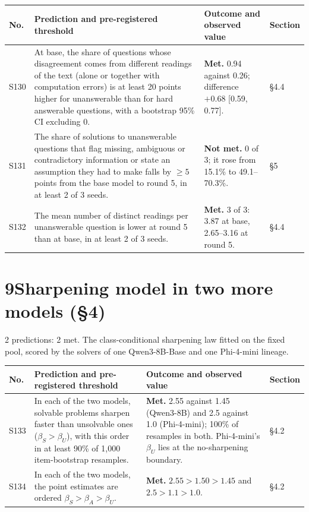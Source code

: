 \documentclass[10pt,a4paper]{article}
\newcommand{\met}{\textbf{Met.}}
\newcommand{\nmet}{\textbf{Not met.}}
\begin{document}
\begingroup\small
\begin{longtable}{@{}L{0.9cm}L{7.8cm}L{6.1cm}L{1.3cm}@{}}
\toprule
No. & Prediction and pre-registered threshold & Outcome and observed value & Section \\
\midrule
\endfirsthead
\bottomrule
\endfoot
S130 & At base, the share of questions whose disagreement comes from different readings of the text (alone or together with computation errors) is at least 20 points higher for unanswerable than for hard answerable questions, with a bootstrap 95\% CI excluding 0. & \met{} 0.94 against 0.26; difference $+0.68$ [0.59, 0.77]. & \S4.4 \\
S131 & The share of solutions to unanswerable questions that flag missing, ambiguous or contradictory information or state an assumption they had to make falls by $\ge 5$ points from the base model to round 5, in at least 2 of 3 seeds. & \nmet{} 0 of 3; it rose from 15.1\% to 49.1--70.3\%. & \S5 \\
S132 & The mean number of distinct readings per unanswerable question is lower at round 5 than at base, in at least 2 of 3 seeds. & \met{} 3 of 3: 3.87 at base, 2.65--3.16 at round 5. & \S4.4 \\
\end{longtable}
\endgroup

\section*{9\quad Sharpening model in two more models (\S4)}
2 predictions: 2 met. The class-conditional sharpening law fitted on the fixed pool, scored by the solvers of one Qwen3-8B-Base and one Phi-4-mini lineage.

\begingroup\small
\begin{longtable}{@{}L{0.9cm}L{7.8cm}L{6.1cm}L{1.3cm}@{}}
\toprule
No. & Prediction and pre-registered threshold & Outcome and observed value & Section \\
\midrule
\endfirsthead
\bottomrule
\endfoot
S133 & In each of the two models, solvable problems sharpen faster than unsolvable ones ($\beta_S > \beta_U$), with this order in at least 90\% of 1,000 item-bootstrap resamples. & \met{} 2.55 against 1.45 (Qwen3-8B) and 2.5 against 1.0 (Phi-4-mini); 100\% of resamples in both. Phi-4-mini's $\beta_U$ lies at the no-sharpening boundary. & \S4.2 \\
S134 & In each of the two models, the point estimates are ordered $\beta_S > \beta_A > \beta_U$. & \met{} $2.55 > 1.50 > 1.45$ and $2.5 > 1.1 > 1.0$. & \S4.2 \\
\end{longtable}
\endgroup
\end{document}
